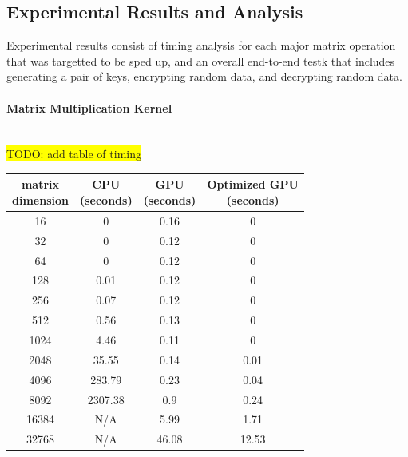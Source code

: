 \documentclass[conference]{IEEEtran}
\begin{document}
    \subsection{Experimental Results and Analysis}\label{Experimental Results and Analysis}
        Experimental results consist of timing analysis for each major matrix operation that was targetted to be sped up, and an overall end-to-end testk that includes generating a pair of keys, encrypting random data, and decrypting random data.
            
            
            
        \paragraph{Matrix Multiplication Kernel}\label{Matrix Multiplication Kernel}\\
        
            \colorbox{yellow}{TODO: add table of timing}
            
            \begin{center}
                {
                \begin{tabular}{ | c | c | c | c | } \hline
                    \shortstack{matrix\\dimension} & \shortstack{CPU\\(seconds)} & \shortstack{GPU\\(seconds)} & \shortstack{Optimized GPU \\(seconds)}\\ \hline
                    16 & 0 & 0.16 & 0 \\ \hline
                    32 & 0 & 0.12 & 0 \\ \hline
                    64 & 0 & 0.12 & 0 \\ \hline
                    128 & 0.01 & 0.12 & 0 \\ \hline
                    256 & 0.07 & 0.12 & 0 \\ \hline
                    512 & 0.56 & 0.13 & 0 \\ \hline
                    1024 & 4.46 & 0.11 & 0 \\ \hline
                    2048 & 35.55 & 0.14 & 0.01\\ \hline
                    4096 & 283.79 & 0.23 & 0.04 \\ \hline
                    8092 & 2307.38 & 0.9 & 0.24\\ \hline
                    16384 & N/A & 5.99 & 1.71\\ \hline
                    32768 & N/A & 46.08 & 12.53\\ \hline
                \end{tabular}
                }
                \label{fig:E2E_table}
            \end{center}
\end{document}
